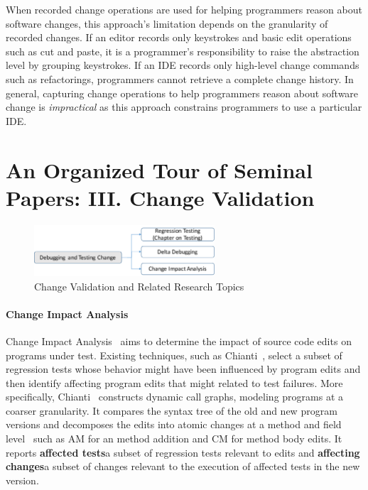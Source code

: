\documentclass[runningheads,a4paper]{llncs}
\begin{document}
When recorded change operations are used for helping programmers reason about software changes, this approach's limitation depends on the granularity of recorded changes. If an editor records only keystrokes and basic edit operations such as cut and paste, it is a programmer's responsibility to raise the abstraction level by grouping keystrokes. If an IDE records only high-level change commands such as refactorings, programmers cannot retrieve a complete change history. 
In general, capturing change operations to help programmers reason about software change is {\it impractical} as this approach constrains programmers to use a particular IDE. 


\section{An Organized Tour of Seminal Papers: III. Change Validation} 
\label{sec:debugtest}

\begin{figure}[ht]
 \centering
 \includegraphics[width=0.6\textwidth]{images/ChangeValidation.pdf} 
 \caption{Change Validation and Related Research Topics} 
 \label{fig:changevalidation} 
\end{figure}

\paragraph{Change Impact Analysis} 

Change Impact Analysis~\cite{bohner1996software, law2003whole, orso2003leveraging, orso2004empirical, ryder2001change, ren2004chianti, ren2006identifying} aims to determine the impact of source code edits on programs under test. Existing techniques, such as Chianti~\cite{ryder2001change,ren2004chianti, ren2006identifying}, select a subset of regression tests whose behavior might have been influenced by program edits and then identify affecting program edits that might related to test failures.  More specifically, Chianti~\cite{Ren2004} constructs dynamic call graphs, modeling programs at a coarser granularity. It compares the syntax tree of the old and new program versions and decomposes the edits into atomic changes at a method and field level~\cite{Ren2004} such as \textsf{AM} for an method addition and \textsf{CM} for method body edits. It reports {\bf affected tests}\textemdash a subset of regression tests relevant to edits and {\bf affecting changes}\textemdash a subset of changes relevant to the execution of affected tests in the new version. 
\end{document}
